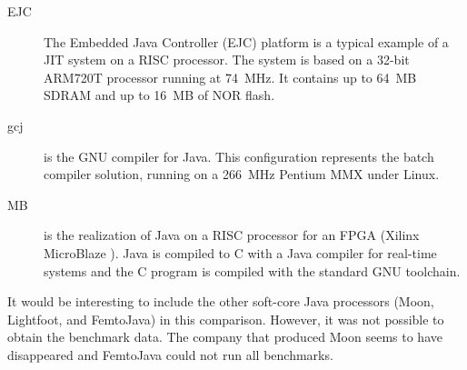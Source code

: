 \begin{description}
    \item[EJC]
The Embedded Java Controller (EJC) platform \cite{EJC} is a typical
example of a JIT system on a RISC processor. The system is based on
a 32-bit ARM720T processor running at 74~MHz. It contains up to
64~MB SDRAM and up to 16~MB of NOR flash.

    \item[gcj]
is the GNU compiler for Java. This configuration represents the
batch compiler solution, running on a 266~MHz Pentium MMX under
Linux.

    \item[MB]
is the realization of Java on a RISC processor for an FPGA (Xilinx
MicroBlaze \cite{microblaze}). Java is compiled to C with a Java
compiler for real-time systems \cite{Java2C} and the C program is
compiled with the standard GNU toolchain.

\end{description}

It would be interesting to include the other soft-core Java
processors (Moon, Lightfoot, and FemtoJava) in this comparison.
However, it was not possible to obtain the benchmark data. The
company that produced Moon seems to have disappeared and FemtoJava
could not run all benchmarks.


